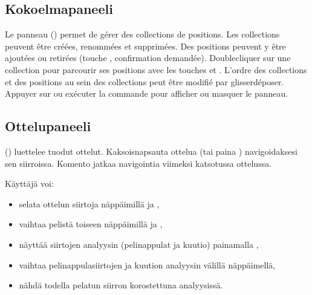 \documentclass[letterpaper,10pt,finnish]{sphinxmanual}
\begin{document}
\subsection{Kokoelmapaneeli}
\label{\detokenize{manuel:panneau-collections}}\label{\detokenize{manuel:id6}}
\sphinxAtStartPar
Le panneau  () permet de gérer des collections de
positions. Les collections peuvent être créées, renommées et supprimées. Des
positions peuvent y être ajoutées ou retirées (touche , confirmation
demandée). Double\sphinxhyphen{}cliquer sur une collection pour parcourir ses positions
avec les touches  et . L’ordre des collections et des
positions au sein des collections peut être modifié par glisser\sphinxhyphen{}déposer.
Appuyer sur  ou exécuter la commande  pour afficher ou
masquer le panneau.


\subsection{Ottelupaneeli}
\label{\detokenize{manuel:panneau-matchs}}\label{\detokenize{manuel:id7}}
\sphinxAtStartPar
{} () luettelee tuodut ottelut. Kaksoisnapsauta ottelua (tai paina ) navigoidaksesi sen siirroissa. Komento  jatkaa navigointia viimeksi katsotussa ottelussa.

\sphinxAtStartPar
Käyttäjä voi:
\begin{itemize}
\item {} 
\sphinxAtStartPar
selata ottelun siirtoja näppäimillä  ja ,

\item {} 
\sphinxAtStartPar
vaihtaa pelistä toiseen näppäimillä  ja ,

\item {} 
\sphinxAtStartPar
näyttää siirtojen analyysin (pelinappulat ja kuutio) painamalla ,

\item {} 
\sphinxAtStartPar
vaihtaa pelinappulasiirtojen ja kuution analyysin välillä \sphinxhyphen{}näppäimellä,

\item {} 
\sphinxAtStartPar
nähdä todella pelatun siirron korostettuna analyysissä.

\end{itemize}
\end{document}

